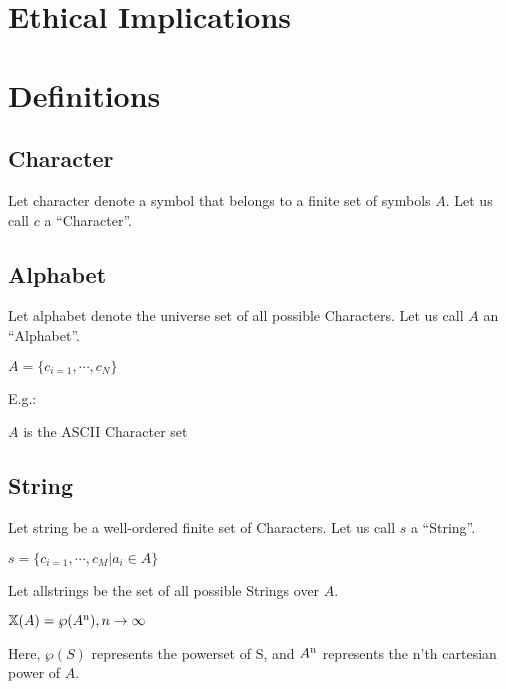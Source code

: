 \documentclass{article}
\begin{document}
\section{Ethical Implications}

\section{Definitions}

\subsection{Character}

Let \gls{character} denote a symbol that belongs to a finite set of symbols $A$. Let us call $c$ a ``Character''. 

\subsection{Alphabet}

Let \gls{alphabet} denote the universe set of all possible Characters. Let us call $A$ an ``Alphabet''.

\begin{center}
$A = \{c_{i=1}, \cdots, c_{N}\}$
\end{center}

E.g.:

\begin{center}
$A$ is the ASCII Character set 
\end{center}

\subsection{String}

Let \gls{string} be a well-ordered finite set of Characters. Let us call $s$ a ``String''.
\begin{center}

$s = \{c_{i=1}, \cdots, c_{M} | a_i \in A\}$

\end{center}

Let \gls{allstrings} be the set of all possible Strings over $A$.

\begin{center}
$\mathbb{X}(A) = \wp(A\textsuperscript{n}), n \to \infty$
\end{center}

Here, $\wp(S)$ represents the powerset of S, and $A\textsuperscript{n}$ represents the n'th cartesian power of $A$.
\end{document}
